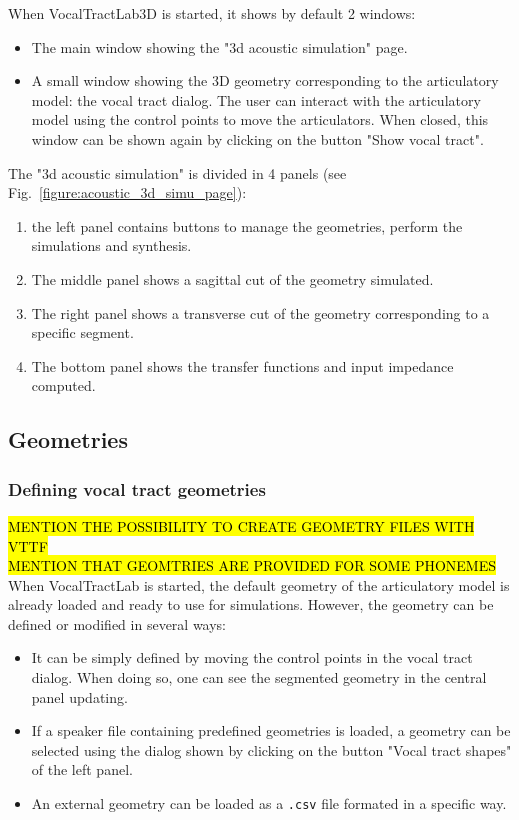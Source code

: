 \documentclass[]{article}
\begin{document}
	When VocalTractLab3D is started, it shows by default 2 windows:
	\begin{itemize}
		\item The main window showing the "3d acoustic simulation" page.
		\item A small window showing the 3D geometry corresponding to the articulatory model: the vocal tract dialog. The user can interact with the articulatory model using the control points to move the articulators. When closed, this window can be shown again by clicking on the button "Show vocal tract".
	\end{itemize}

	The "3d acoustic simulation" is divided in 4 panels (see Fig.~\ref{figure:acoustic_3d_simu_page}):
	\begin{enumerate}
		\item the left panel contains buttons to manage the geometries, perform the simulations and synthesis.
		\item The middle panel shows a sagittal cut of the geometry simulated.
		\item The right panel shows a transverse cut of the geometry corresponding to a specific segment.
		\item The bottom panel shows the transfer functions and 
		input impedance computed. 
	\end{enumerate}

	\subsection{Geometries}

	\subsubsection{Defining vocal tract geometries}
	
	\hl{MENTION THE POSSIBILITY TO CREATE GEOMETRY FILES WITH VTTF} \\
	
	\hl{MENTION THAT GEOMTRIES ARE PROVIDED FOR SOME PHONEMES} \\
	
	When VocalTractLab is started, the default geometry of the articulatory model is already loaded and ready to use for 
	simulations.
	However, the geometry can be defined or modified in several ways:
	\begin{itemize}
		\item It can be simply defined by moving the control points in
		the vocal tract dialog. When doing so, one can see the segmented 
		geometry in the central panel updating.
		\item If a speaker file containing predefined geometries is loaded, a geometry can be selected using the dialog shown by 
		clicking on the button "Vocal tract shapes" of the left panel.
		\item An external geometry can be loaded as a \texttt{.csv} file
		formated in a specific way. 
	\end{itemize}
\end{document}
